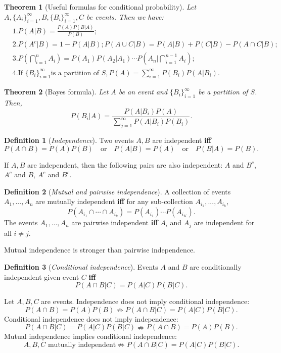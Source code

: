 \documentclass[11pt]{article}
\theoremstyle{plain}
\newtheorem{thm}{Theorem}[section]
\theoremstyle{definition}
\newtheorem{defn}{Definition}
\begin{document}
\begin{thm}[Useful formulas for conditional probability]\label{thm:condprobability}
Let $A,\{A_i\}_{i=1}^{\infty}, B, \{B_i\}_{i=1}^{\infty},C$ be events. Then we have:
\begin{align}
	&1.  P(A|B) = \frac{P(A)P(B|A)}{P(B)}; \\
	&2. P(A^c|B) = 1- P(A|B); P(A \cup C|B) = P(A|B) + P(C|B) - P(A \cap C|B);\\
	&3. P(\bigcap_{i=1}^{n} A_i) = P(A_1) P(A_2|A_1)\cdots P(A_n|\bigcap_{i=1}^{n-1} A_i);\\
	&4. \text{If } \{B_i\}_{i=1}^{\infty} \text{is a partition of }S, P(A) = \sum_{i=1}^{\infty} P(B_i) P(A|B_i).
\end{align}
\end{thm}

\begin{thm}[Bayes formula]\label{thm:bayesformula}
Let $A$ be an event and $\{ B_i\}_{i=1}^{\infty}$ be a partition of $S$. Then,
\[  P(B_i|A) = \frac{P(A|B_i) P(A)}{\sum_{j=1}^{\infty} P(A|B_i) P(B_i) }.  \]
\end{thm}

\begin{defn}[\textit{Independence}]\label{def:indep}
Two events $A,B$ are independent \textbf{iff} 
\[ P(A\cap B) = P(A) P(B) \quad \text{or} \quad P(A|B) = P(A) \quad \text{or} \quad  P(B|A) = P(B).\]
\end{defn}
If $A,B$ are independent, then the following pairs are also independent: $A$ and $B^c$,  $A^c$ and $B$, $A^c$ and $B^c$.

\begin{defn}[\textit{Mutual  and pairwise independence}]\label{def:mindep} A collection of events $A_1,...,A_n$ are mutually independent \textbf{iff} for any sub-collection $A_{i_1},...,A_{i_k},$
\[ P(A_{i_1} \cap \cdots \cap A_{i_k}) = P(A_{i_1})\cdots P(A_{i_K}). \]
The events $A_1,...,A_n$ are pairwise independent \textbf{iff} $A_i$ and $A_j$ are independent for all $i\neq j$.

Mutual independence is stronger than pairwise independence.
\end{defn}

\begin{defn}[\textit{Conditional independence}]\label{def:cindep}
Events $A$ and $B$ are conditionally independent given event $C$ \textbf{iff} 
\[ P(A\cap B|C) = P(A|C)P(B|C).\]
\end{defn}

Let $A,B,C$ are events. Independence does not imply conditional independence:
\[ P(A\cap B) = P(A) P(B) \nRightarrow P(A\cap B|C) = P(A|C) P(B|C). \]
Conditional independence does not imply independence:
\[ P(A\cap B|C) = P(A|C) P(B|C) \nRightarrow P(A\cap B) = P(A) P(B).  \]
Mutual independence implies conditional independence:
\[ A,B,C\text{ mutually independent} \nRightarrow P(A\cap B|C) = P(A|C) P(B|C). \]
\end{document}

